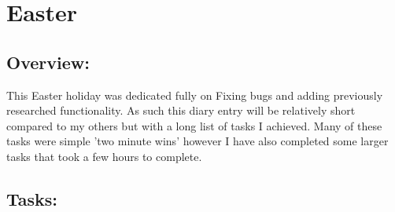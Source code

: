 \section{Easter}

\subsection*{Overview:}
This Easter holiday was dedicated fully on Fixing bugs and adding previously researched functionality. As such this diary entry will be relatively short compared to my others but with a long list of tasks I achieved. Many of these tasks were simple 'two minute wins' however I have also completed some larger tasks that took a few hours to complete.   
\subsection*{Tasks:}

